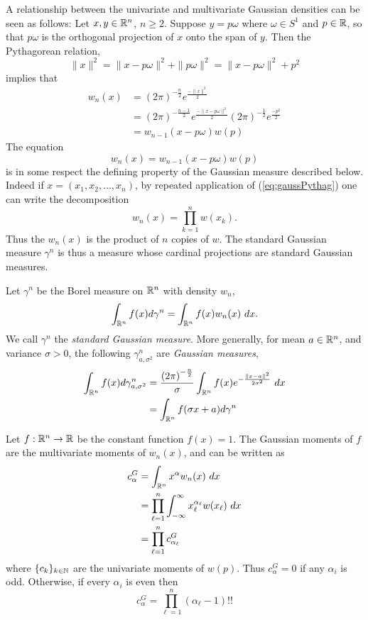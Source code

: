 A relationship between the univariate and multivariate Gaussian densities can be seen as follows: Let $x, y \in \mathbb{R}^n$, $n \geq 2$. Suppose $y = p\omega$ where $\omega \in S^1$ and $p \in \mathbb{R}$, so that $p\omega$ is the orthogonal projection of $x$ onto the span of $y$. Then the Pythagorean relation,
\[
  \|x\|^2 = \|x - p\omega\|^2 + \|p\omega\|^2 = \|x - p\omega\|^2 + p^2
\]
implies that
\begin{align*}
  w_n(x) 
  &= {(2\pi)}^{-\frac n2} e^{\frac{-\|x\|^2}2} \\
  &= {(2\pi)}^{-\frac{n-1}2} e^{\frac{-\|x - p\omega\|^2}2} {(2\pi)}^{-\frac12} e^{\frac{-p^2}2} \\
  &= w_{n-1}(x - p\omega)w(p)
\end{align*}
The equation
\begin{equation}\label{eq:gaussPythag}
  w_n(x) = w_{n-1}(x - p\omega)w(p)
\end{equation}
is in some respect the defining property of the Gaussian measure described below. Indeed if $x = (x_1, x_2, \ldots, x_n)$, by repeated application of (\ref{eq:gaussPythag}) one can write the decomposition
\[
  w_n(x) = \prod_{k = 1}^n w(x_k).
\]
Thus the $w_n(x)$ is the product of $n$ copies of $w$. The standard Gaussian measure $\gamma^n$ is thus a measure whose cardinal projections are standard Gaussian measures.

\begin{definition}
Let $\gamma^n$ be the Borel measure on $\mathbb{R}^n$ with density $w_n$,
\[
  \int_{\mathbb{R}^n} f(x) d\gamma^n = \int_{\mathbb{R}^n} f(x) w_n(x) ~dx.
\]
We call $\gamma^n$ the \textit{standard Gaussian measure}. 
More generally, for mean $a \in \mathbb{R}^n$, and variance $\sigma > 0$, the following $\gamma^{n}_{a, \sigma^2}$ are \textit{Gaussian measures},
\begin{align*}
  \int_{\mathbb{R}^n} f(x) d\gamma^n_{a,\sigma^2}
  &= \frac{{(2\pi)}^{-\frac n2}}{\sigma}  \int_{\mathbb{R}^n} f(x) e^{-\frac{\|x - a\|^2}{2\sigma^2}} ~dx \\
  &= \int_{\mathbb{R}^n} f(\sigma x + a) d\gamma^n
\end{align*}
\end{definition}

\begin{myexample}
  Let $f:\mathbb{R}^n \rightarrow \mathbb{R}$ be the constant function $f(x)=1$. The Gaussian moments of $f$ are the multivariate moments of $w_n(x)$, and can be written as
  \begin{align*}
    c^G_\alpha 
    &= \int_{\mathbb{R}^n} x^\alpha w_n(x) ~dx \\
    &= \prod_{\ell = 1}^n \int_{-\infty}^\infty x_\ell^{\alpha_\ell} w(x_\ell) ~dx \\
    &= \prod_{\ell = 1}^n c^G_{\alpha_\ell}
  \end{align*}
  where $\{c_k\}_{k \in \mathbb{N}}$ are the univariate moments of $w(p)$.
  Thus $c^G_\alpha = 0$ if any $\alpha_i$ is odd. Otherwise, if every $\alpha_i$ is even then
  \[
    c^G_\alpha = \prod_{\ell = 1}^n (\alpha_\ell - 1)!!
  \]
\end{myexample}

